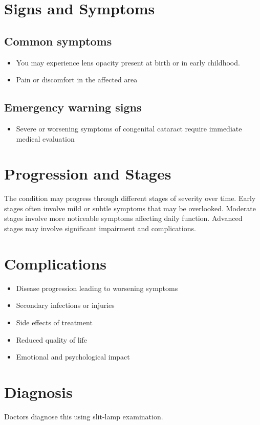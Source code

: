 \section{Signs and Symptoms}

\subsection{Common symptoms}
\begin{itemize}[noitemsep]
  \item You may experience lens opacity present at birth or in early childhood.

  \item Pain or discomfort in the affected area
  \end{itemize}

\subsection{Emergency warning signs}
\begin{itemize}[noitemsep]
  \item Severe or worsening symptoms of congenital cataract require immediate medical evaluation
\end{itemize}
\section{Progression and Stages}
The condition may progress through different stages of severity over time. Early stages often involve mild or subtle symptoms that may be overlooked. Moderate stages involve more noticeable symptoms affecting daily function. Advanced stages may involve significant impairment and complications.
\section{Complications}
\begin{itemize}[noitemsep]
  \item Disease progression leading to worsening symptoms
  \item Secondary infections or injuries
  \item Side effects of treatment
  \item Reduced quality of life
  \item Emotional and psychological impact
\end{itemize}
\section{Diagnosis}
Doctors diagnose this using slit-lamp examination.

